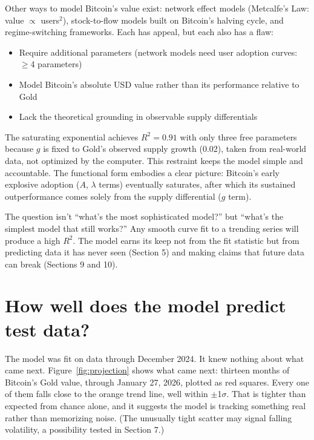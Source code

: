 \documentclass[11pt,letterpaper]{article}
\begin{document}
Other ways to model Bitcoin's value exist: network effect models (Metcalfe's Law: value $\propto$ users$^2$), stock-to-flow models built on Bitcoin's halving cycle, and regime-switching frameworks. Each has appeal, but each also has a flaw:
\begin{itemize}
    \item Require additional parameters (network models need user adoption curves: $\geq$4 parameters)
    \item Model Bitcoin's absolute USD value rather than its performance relative to Gold
    \item Lack the theoretical grounding in observable supply differentials
\end{itemize}

The saturating exponential achieves $R^2 = 0.91$ with only three free parameters because $g$ is fixed to Gold's observed supply growth (0.02), taken from real-world data, not optimized by the computer. This restraint keeps the model simple and accountable. The functional form embodies a clear picture: Bitcoin's early explosive adoption ($A$, $\lambda$ terms) eventually saturates, after which its sustained outperformance comes solely from the supply differential ($g$ term).

The question isn't ``what's the most sophisticated model?'' but ``what's the simplest model that still works?'' Any smooth curve fit to a trending series will produce a high $R^2$. The model earns its keep not from the fit statistic but from predicting data it has never seen (Section 5) and making claims that future data can break (Sections 9 and 10).

\section{How well does the model predict test data?}

The model was fit on data through December 2024. It knew nothing about what came next. Figure~\ref{fig:projection} shows what came next: thirteen months of Bitcoin's Gold value, through January 27, 2026, plotted as red squares. Every one of them falls close to the orange trend line, well within $\pm$1$\sigma$. That is tighter than expected from chance alone, and it suggests the model is tracking something real rather than memorizing noise. (The unusually tight scatter may signal falling volatility, a possibility tested in Section 7.)
\end{document}
